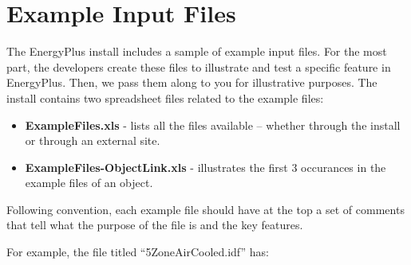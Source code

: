 \chapter{Example Input Files}\label{example-input-files}

The EnergyPlus install includes a sample of example input files. For the most part, the developers create these files to illustrate and test a specific feature in EnergyPlus. Then, we pass them along to you for illustrative purposes. The install contains two spreadsheet files related to the example files:

\begin{itemize}
\item
  \textbf{ExampleFiles.xls} - lists all the files available -- whether through the install or through an external site.
\item
  \textbf{ExampleFiles-ObjectLink.xls} - illustrates the first 3 occurances in the example files of an object.
\end{itemize}

Following convention, each example file should have at the top a set of comments that tell what the purpose of the file is and the key features.

For example, the file titled ``5ZoneAirCooled.idf'' has:

